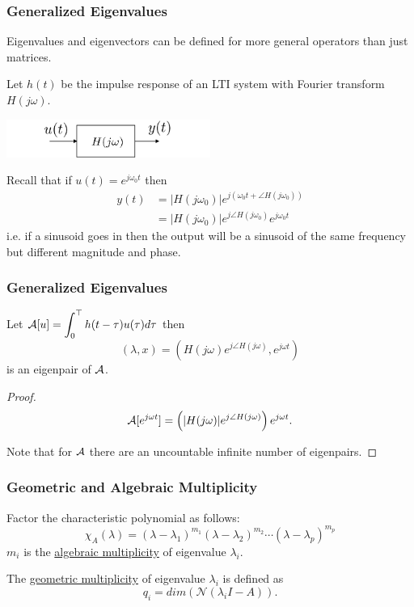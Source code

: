 \documentclass{beamer}
\begin{document}
\begin{frame}\frametitle{Generalized Eigenvalues}
	Eigenvalues and eigenvectors can be defined for more general operators than just matrices.
	
	\begin{example}
		Let $h(t)$ be the impulse response of an LTI system with Fourier transform $H(j\omega)$.
		\begin{center}
			\includegraphics[width=0.5\textwidth]{figures/chap6_linear_system}	
		\end{center}
		Recall that if $u(t)=e^{j\omega_0 t}$ then 
		\begin{align*}
		 y(t) &= |H(j\omega_0)|e^{j\left(\omega_0 t + \angle H(j\omega_0)\right)}\\
		&= |H(j\omega_0)|e^{j\angle H(j\omega_0)}e^{j\omega_0 t}
		\end{align*}
		i.e. if a sinusoid goes in then the output will be a sinusoid of the
		same frequency but different magnitude and phase.		
	\end{example}
\end{frame}

\begin{frame}\frametitle{Generalized Eigenvalues}
	\begin{lemma}
		Let $\mathcal{A}[u] = \displaystyle \int_0^\top  h(t-\tau)u(\tau)d\tau $ then
		\[ 
			(\lambda,x) = \left( H(j\omega)e^{j\angle H(j\omega)},e^{j\omega t} \right) 
		\]
		is an eigenpair of $\mathcal{A}$.
	\end{lemma}
	\begin{proof}
		\[ 
			\mathcal{A}[e^{j\omega t}] = \left( |H(j\omega)|e^{j\angle
		    H(j\omega)}\right) e^{j\omega t}.
		\]
		
		Note that for $\mathcal{A}$ there are an uncountable infinite number of eigenpairs.		
	\end{proof}
\end{frame}

\begin{frame}\frametitle{Geometric and Algebraic Multiplicity}
	\begin{definition}
		Factor the characteristic polynomial as follows:
		\[ 
			\chi_A(\lambda) = (\lambda-\lambda_1)^{m_1}(\lambda-\lambda_2)^{m_2}\cdots(\lambda-\lambda_p)^{m_p}
		\]
		$m_i$ is the \underline{algebraic multiplicity} of eigenvalue $\lambda_i$.	
	\end{definition}
	
	\begin{definition}
		The \underline{geometric multiplicity} of eigenvalue $\lambda_i$ is defined as 
		\[
			q_i = dim(\mathcal{N}(\lambda_iI-A)).
		\]
	\end{definition}
\end{frame}
\end{document}
